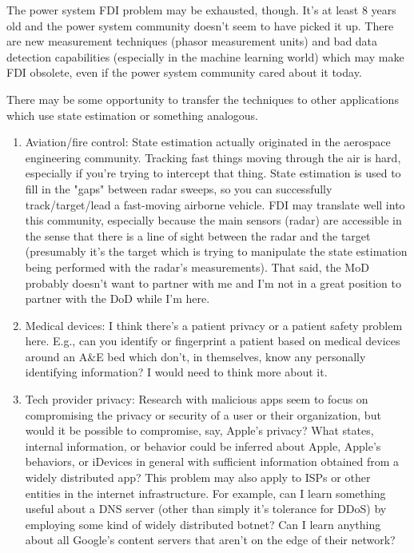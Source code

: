 \documentclass{article}
\begin{document}
The power system FDI problem may be exhausted, though.  It's at least 8 years old and the power system community doesn't seem to have picked it up.  There are new measurement techniques (phasor measurement units) and bad data detection capabilities (especially in the machine learning world) which may make FDI obsolete, even if the power system community cared about it today.

There may be some opportunity to transfer the techniques to other applications which use state estimation or something analogous.
\begin{enumerate}
    \item Aviation/fire control:  State estimation actually originated in the aerospace engineering community.  Tracking fast things moving through the air is hard, especially if you're trying to intercept that thing.  State estimation is used to fill in the "gaps" between radar sweeps, so you can successfully track/target/lead a fast-moving airborne vehicle.  FDI may translate well into this community, especially because the main sensors (radar) are accessible in the sense that there is a line of sight between the radar and the target (presumably it's the target which is trying to manipulate the state estimation being performed with the radar's measurements).  That said, the MoD probably doesn't want to partner with me and I'm not in a great position to partner with the DoD while I'm here.
    \item Medical devices:  I think there's a patient privacy or a patient safety problem here.  E.g., can you identify or fingerprint a patient based on medical devices around an A\&E bed which don't, in themselves, know any personally identifying information?  I would need to think more about it.
    \item Tech provider privacy:  Research with malicious apps seem to focus on compromising the privacy or security of a user or their organization, but would it be possible to compromise, say, Apple's privacy?  What states, internal information, or behavior could be inferred about Apple, Apple's behaviors, or iDevices in general with sufficient information obtained from a widely distributed app?  This problem may also apply to ISPs or other entities in the internet infrastructure.  For example, can I learn something useful about a DNS server (other than simply it's tolerance for DDoS) by employing some kind of widely distributed botnet?  Can I learn anything about all Google's content servers that aren't on the edge of their network?
\end{enumerate}
\end{document}
